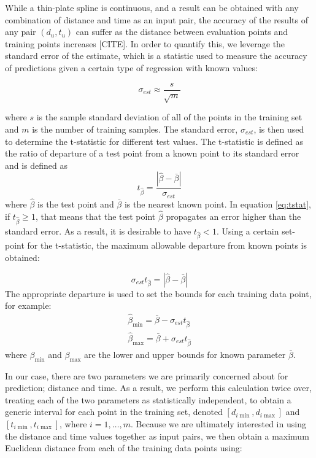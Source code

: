 \documentclass[letterpaper, 10 pt, conference]{ieeeconf}  %
\begin{document}
While a thin-plate spline is continuous, and a result can be obtained with any combination of distance and time as an input pair, the accuracy of the results of any pair $(d_u,t_u)$ can suffer as the distance between evaluation points and training points increases [CITE]. In order to quantify this, we leverage the standard error of the estimate, which is a statistic used to measure the accuracy of predictions given a certain type of regression with known values:

\begin{equation} \label{eq:stderr}
    \sigma_{est} \approx \frac{s}{\sqrt{m}}
\end{equation}

where $s$ is the sample standard deviation of all of the points in the training set and $m$ is the number of training samples. The standard error, $\sigma_{est}$, is then used to determine the t-statistic for different test values. The t-statistic is defined as the ratio of departure of a test point from a known point to its standard error and is defined as
\begin{equation} \label{eq:tstat}
t_{\hat{\beta}} = \frac{|\hat{\beta}-\bar{\beta}|}{\sigma_{est}}    
\end{equation}
where $\hat{\beta}$ is the test point and $\bar{\beta}$ is the nearest known point. In equation \eqref{eq:tstat}, if $t_{\hat{\beta}} \geq 1$, that means that the test point $\hat{\beta}$ propagates an error higher than the standard error. As a result, it is desirable to have $t_{\hat{\beta}} < 1$. Using a certain set-point for the t-statistic, the maximum allowable departure from known points is obtained:

\begin{equation}
    \sigma_{est}t_{\hat{\beta}} = |\hat{\beta}-\bar{\beta}|
\end{equation}
The appropriate departure is used to set the bounds for each training data point, for example:
\begin{align}
    \hat{\beta}_{\min} = \bar{\beta} - \sigma_{est}t_{\hat{\beta}} \nonumber \\
    \hat{\beta}_{\max} = \bar{\beta} + \sigma_{est}t_{\hat{\beta}}
\end{align}
where $\beta_{\min}$ and $\beta_{\max}$ are the lower and upper bounds for known parameter $\bar{\beta}$.

In our case, there are two parameters we are primarily concerned about for prediction; distance and time. As a result, we perform this calculation twice over, treating each of the two parameters as statistically independent, to obtain a generic interval for each point in the training set, denoted $[d_{i\min},d_{i\max}]$ and $[t_{i\min},t_{i\max}]$, where $i=1,\ldots,m$. Because we are ultimately interested in using the distance and time values together as input pairs, we then obtain a maximum Euclidean distance from each of the training data points using:
\end{document}
